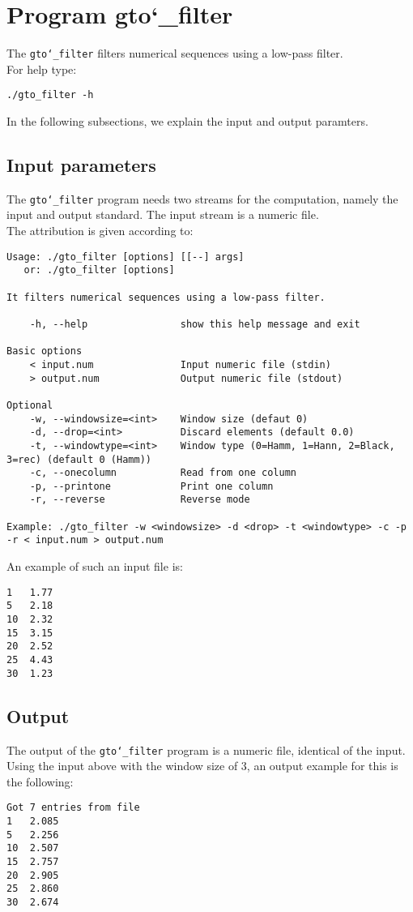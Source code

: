 \section{Program gto\char`_filter}
The \texttt{gto\char`_filter} filters numerical sequences using a low-pass filter.\\
For help type:
\begin{lstlisting}
./gto_filter -h
\end{lstlisting}
In the following subsections, we explain the input and output paramters.

\subsection*{Input parameters}

The \texttt{gto\char`_filter} program needs two streams for the computation, namely the input and output standard. The input stream is a numeric file.\\
The attribution is given according to:
\begin{lstlisting}
Usage: ./gto_filter [options] [[--] args]
   or: ./gto_filter [options]

It filters numerical sequences using a low-pass filter.

    -h, --help                show this help message and exit

Basic options
    < input.num               Input numeric file (stdin)
    > output.num              Output numeric file (stdout)

Optional
    -w, --windowsize=<int>    Window size (defaut 0)
    -d, --drop=<int>          Discard elements (default 0.0)
    -t, --windowtype=<int>    Window type (0=Hamm, 1=Hann, 2=Black, 3=rec) (default 0 (Hamm))
    -c, --onecolumn           Read from one column
    -p, --printone            Print one column
    -r, --reverse             Reverse mode

Example: ./gto_filter -w <windowsize> -d <drop> -t <windowtype> -c -p -r < input.num > output.num
\end{lstlisting}
An example of such an input file is:
\begin{lstlisting}
1   1.77
5   2.18
10  2.32
15  3.15
20  2.52
25  4.43
30  1.23
\end{lstlisting}

\subsection*{Output}
The output of the \texttt{gto\char`_filter} program is a numeric file, identical of the input.\\
Using the input above with the window size of 3, an output example for this is the following:
\begin{lstlisting}
Got 7 entries from file
1   2.085
5   2.256
10  2.507
15  2.757
20  2.905
25  2.860
30  2.674
\end{lstlisting}